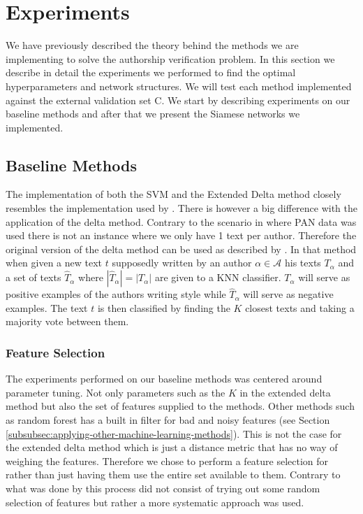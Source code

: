\section{Experiments} \label{sec:experiments} 

We have previously described the theory behind the methods we are implementing
to solve the authorship verification problem. In this section we describe
in detail the experiments we performed to find the optimal hyperparameters and
network structures. We will test each method implemented against the external
validation set \gls{C}. We start by describing experiments on our baseline
methods and after that we present the Siamese networks we implemented.

\subsection{Baseline Methods} \label{subsec:baseline_methods}

The implementation of both the \gls{SVM} and the Extended Delta method closely
resembles the implementation used by \citet{US}. There is however a big
difference with the application of the delta method. Contrary to the scenario
in \citep{US} where PAN data was used there is not an instance where we only
have 1 text per author. Therefore the original version of the delta method can
be used as described by \citet{evert2015towards}. In that method when given
a new text $t$ supposedly written by an author $\alpha \in \mathcal{A}$ his
texts $T_\alpha$ and a set of texts $\hat{T}_\alpha$ where $|\hat{T}_\alpha|
= |T_\alpha|$ are given to a \gls{KNN} classifier. $T_\alpha$ will serve as
positive examples of the authors writing style while $\hat{T}_\alpha$ will serve
as negative examples. The text $t$ is then classified by finding the $K$ closest
texts and taking a majority vote between them.

\subsubsection{Feature Selection}

The experiments performed on our baseline methods was centered around parameter
tuning. Not only parameters such as the $K$ in the extended delta method
but also the set of features supplied to the methods. Other methods such as
random forest has a built in filter for bad and noisy features (see Section
\ref{subsubsec:applying-other-machine-learning-methods}). This is not the case
for the extended delta method which is just a distance metric that has no way
of weighing the features. Therefore we chose to perform a feature selection for
rather than just having them use the entire set available to them. Contrary to
what was done by \citet{US} this process did not consist of trying out some
random selection of features but rather a more systematic approach was used.


